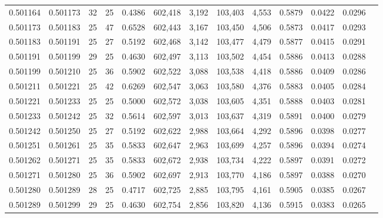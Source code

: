 \begin{tabular}{rrrrrrrrrrrrr}
0.501164 & 0.501173 &    32 &  25 &                                     0.4386 & 602,418 &   3,192 & 103,403 &   4,553 & 0.5879 & 0.0422 & 0.0296 \\
0.501173 & 0.501183 &    25 &  47 &                                     0.6528 & 602,443 &   3,167 & 103,450 &   4,506 & 0.5873 & 0.0417 & 0.0293 \\
0.501183 & 0.501191 &    25 &  27 &                                     0.5192 & 602,468 &   3,142 & 103,477 &   4,479 & 0.5877 & 0.0415 & 0.0291 \\
0.501191 & 0.501199 &    29 &  25 &                                     0.4630 & 602,497 &   3,113 & 103,502 &   4,454 & 0.5886 & 0.0413 & 0.0288 \\
0.501199 & 0.501210 &    25 &  36 &                                     0.5902 & 602,522 &   3,088 & 103,538 &   4,418 & 0.5886 & 0.0409 & 0.0286 \\
0.501211 & 0.501221 &    25 &  42 &                                     0.6269 & 602,547 &   3,063 & 103,580 &   4,376 & 0.5883 & 0.0405 & 0.0284 \\
0.501221 & 0.501233 &    25 &  25 &                                     0.5000 & 602,572 &   3,038 & 103,605 &   4,351 & 0.5888 & 0.0403 & 0.0281 \\
0.501233 & 0.501242 &    25 &  32 &                                     0.5614 & 602,597 &   3,013 & 103,637 &   4,319 & 0.5891 & 0.0400 & 0.0279 \\
0.501242 & 0.501250 &    25 &  27 &                                     0.5192 & 602,622 &   2,988 & 103,664 &   4,292 & 0.5896 & 0.0398 & 0.0277 \\
0.501251 & 0.501261 &    25 &  35 &                                     0.5833 & 602,647 &   2,963 & 103,699 &   4,257 & 0.5896 & 0.0394 & 0.0274 \\
0.501262 & 0.501271 &    25 &  35 &                                     0.5833 & 602,672 &   2,938 & 103,734 &   4,222 & 0.5897 & 0.0391 & 0.0272 \\
0.501271 & 0.501280 &    25 &  36 &                                     0.5902 & 602,697 &   2,913 & 103,770 &   4,186 & 0.5897 & 0.0388 & 0.0270 \\
0.501280 & 0.501289 &    28 &  25 &                                     0.4717 & 602,725 &   2,885 & 103,795 &   4,161 & 0.5905 & 0.0385 & 0.0267 \\
0.501289 & 0.501299 &    29 &  25 &                                     0.4630 & 602,754 &   2,856 & 103,820 &   4,136 & 0.5915 & 0.0383 & 0.0265 \\

\end{tabular}
